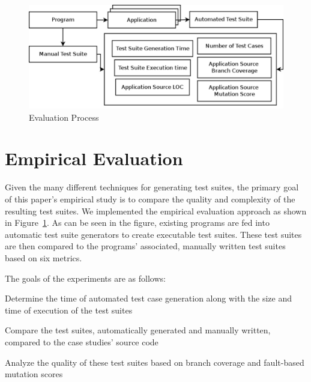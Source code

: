 
\begin{figure}[!t]
\centering
\captionsetup{justification=centering}
  \includegraphics[width=\linewidth]{proccess_diagram.pdf}
  \caption{Evaluation Process
  \label{fig:process_diagram}
  }
\end{figure}

\section{Empirical Evaluation}
\label{sec:evaluation}
Given the many different techniques for generating test suites, the primary goal of this paper's empirical study is to compare the quality and complexity of the resulting test suites.  We implemented the empirical evaluation approach as shown in Figure~\ref{fig:process_diagram}.  As can be seen in the figure, existing programs are fed into automatic test suite generators to create executable test suites.  These test suites are then compared to the programs' associated, manually written test suites based on six metrics.   

The goals of the experiments are as follows:
\squishlist
\item Determine the time of automated test case generation along with the size and time of execution of the test suites
\item Compare the test suites, automatically generated and manually written, compared to the case studies' source code
\item Analyze the quality of these test suites based on branch coverage and fault-based mutation scores
\squishend

